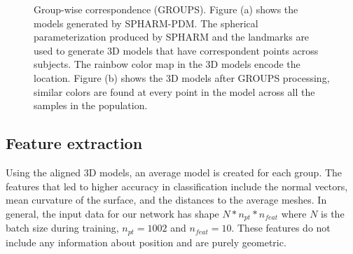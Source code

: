 \documentclass[]{spie}  %
\begin{document}
\begin{figure}[b]
\centering 
    \caption{Group-wise correspondence (GROUPS). Figure (a) shows the models generated by SPHARM-PDM. The spherical parameterization produced by SPHARM and the landmarks are used to generate 3D models that have correspondent points across subjects. The rainbow color map in the 3D models encode the location. Figure (b) shows the 3D models after GROUPS processing, similar colors are found at every point in the model across all the samples 
    in the population.}
    \label{fig:groups}
\end{figure}

\subsection{Feature extraction}

Using the aligned 3D models, an average model is created for each group.
The features that led to higher accuracy in classification include 
the normal vectors, mean curvature of the surface, and the distances to the average meshes. 
In general, the input data for our network has shape  $N * n_{pt} * n_{feat}$ where $N$ is the batch size during training, 
$n_{pt} = 1002$ and $n_{feat} = 10$. These features do not include any information about position and are purely geometric.
\end{document}
